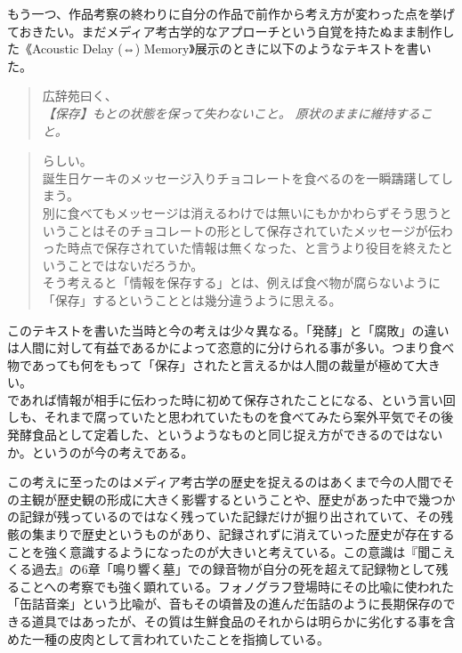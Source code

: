 \documentclass[a4paper,report]{jsbook}
\begin{document}
もう一つ、作品考察の終わりに自分の作品で前作から考え方が変わった点を挙げておきたい。まだメディア考古学的なアプローチという自覚を持たぬまま制作した《Acoustic
Delay (⇔) Memory》展示のときに以下のようなテキストを書いた。

\begin{quote}
広辞苑曰く、\\
\emph{【保存】もとの状態を保って失わないこと。
原状のままに維持すること。}
\end{quote}

\begin{quote}
らしい。\\
誕生日ケーキのメッセージ入りチョコレートを食べるのを一瞬躊躇してしまう。\\
別に食べてもメッセージは消えるわけでは無いにもかかわらずそう思うということはそのチョコレートの形として保存されていたメッセージが伝わった時点で保存されていた情報は無くなった、と言うより役目を終えたということではないだろうか。\\
そう考えると「情報を保存する」とは、例えば食べ物が腐らないように「保存」するということとは幾分違うように思える。
\end{quote}

このテキストを書いた当時と今の考えは少々異なる。「発酵」と「腐敗」の違いは人間に対して有益であるかによって恣意的に分けられる事が多い。つまり食べ物であっても何をもって「保存」されたと言えるかは人間の裁量が極めて大きい。\\
であれば情報が相手に伝わった時に初めて保存されたことになる、という言い回しも、それまで腐っていたと思われていたものを食べてみたら案外平気でその後発酵食品として定着した、というようなものと同じ捉え方ができるのではないか。というのが今の考えである。

この考えに至ったのはメディア考古学の歴史を捉えるのはあくまで今の人間でその主観が歴史観の形成に大きく影響するということや、歴史があった中で幾つかの記録が残っているのではなく残っていた記録だけが掘り出されていて、その残骸の集まりで歴史というものがあり、記録されずに消えていった歴史が存在することを強く意識するようになったのが大きいと考えている。この意識は『聞こえくる過去』の6章「鳴り響く墓」での録音物が自分の死を超えて記録物として残ることへの考察でも強く顕れている。フォノグラフ登場時にその比喩に使われた「缶詰音楽」という比喩が、音もその頃普及の進んだ缶詰のように長期保存のできる道具ではあったが、その質は生鮮食品のそれからは明らかに劣化する事を含めた一種の皮肉として言われていたことを指摘している。
\end{document}

